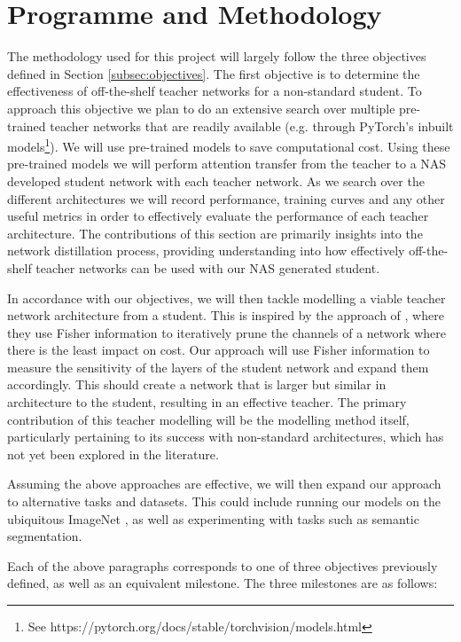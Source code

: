 \documentclass[a4paper,11pt]{article}
\begin{document}
\section{Programme and Methodology}
\label{sec:methodology}
The methodology used for this project will largely follow the three objectives defined in Section \ref{subsec:objectives}. The first objective is to determine the effectiveness of off-the-shelf teacher networks for a non-standard student. To approach this objective we plan to do an extensive search over multiple pre-trained teacher networks that are readily available (e.g. through PyTorch's inbuilt models\footnote{See https://pytorch.org/docs/stable/torchvision/models.html}). We will use pre-trained models to save computational cost. Using these pre-trained models we will perform attention transfer from the teacher to a NAS developed student network with each teacher network. As we search over the different architectures we will record performance, training curves and any other useful metrics in order to effectively evaluate the performance of each teacher architecture. The contributions of this section are primarily insights into the network distillation process, providing understanding into how effectively off-the-shelf teacher networks can be used with our NAS generated student.

In accordance with our objectives, we will then tackle modelling a viable teacher network architecture from a student. This is inspired by the approach of \cite{turner2019distilling}, where they use Fisher information to iteratively prune the channels of a network where there is the least impact on cost. Our approach will use Fisher information to measure the sensitivity of the layers of the student network and expand them accordingly. This should create a network that is larger but similar in architecture to the student, resulting in an effective teacher. The primary contribution of this teacher modelling will be the modelling method itself, particularly pertaining to its success with non-standard architectures, which has not yet been explored in the literature. 

Assuming the above approaches are effective, we will then expand our approach to alternative tasks and datasets. This could include running our models on the ubiquitous ImageNet \cite{deng2009imagenet}, as well as experimenting with tasks such as semantic segmentation.

Each of the above paragraphs corresponds to one of three objectives previously defined, as well as an equivalent milestone. The three milestones are as follows:
\end{document}
